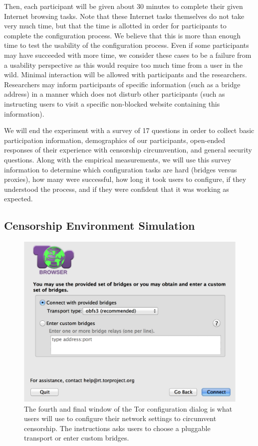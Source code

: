 \documentclass[letterpaper,twocolumn,11pt]{article}
\begin{document}
Then, each participant will be given about 30 minutes to complete their given Internet browsing tasks. 
Note that these Internet tasks themselves do not take very much time, but that the time is allotted in order
for participants to complete the configuration process. We believe that this is more than enough time to 
test the usability of the configuration process. Even if some participants may have succeeded with more 
time, we consider these cases to be a failure from a usability perspective as this would require too much
time from a user in the wild. Minimal interaction will be allowed with participants and the researchers. 
Researchers may inform participants of specific information (such as a bridge address) in a manner 
which does not disturb other participants (such as instructing users to visit a specific non-blocked website 
containing this information). 

We will end the experiment with a survey of 17 questions in order to collect basic participation information, 
demographics of our participants, open-ended responses of their experience with censorship circumvention,
and general security questions. Along with the empirical measurements, we will use this survey information to determine which configuration tasks are hard (bridges versus proxies), how many were successful, how long it took users to configure, if they understood the process, and if they were confident that it was working as expected. 

\subsection{Censorship Environment Simulation}

\begin{figure}[t]
\includegraphics[width=\linewidth]{configuration-dialog.png}
\caption{The fourth and final window of the Tor configuration dialog is what users will use to 
configure their network settings to circumvent censorship. The instructions asks users to 
choose a pluggable transport or enter custom bridges.}
\label{dialog}
\end{figure}
\end{document}
